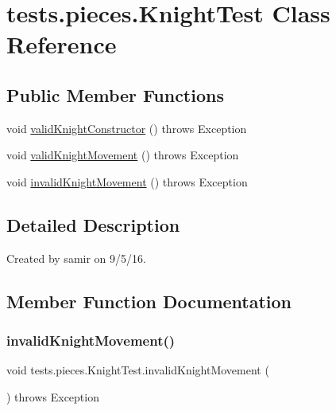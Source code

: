 \hypertarget{classtests_1_1pieces_1_1_knight_test}{}\section{tests.\+pieces.\+Knight\+Test Class Reference}
\label{classtests_1_1pieces_1_1_knight_test}
\subsection*{Public Member Functions}
\begin{DoxyCompactItemize}
\item 
void \hyperlink{classtests_1_1pieces_1_1_knight_test_ac63e8a47040357e6f02594034d0ecb75}{valid\+Knight\+Constructor} ()  throws Exception 
\item 
void \hyperlink{classtests_1_1pieces_1_1_knight_test_a1f441301e64a3dd8330a3646fcb25c0b}{valid\+Knight\+Movement} ()  throws Exception 
\item 
void \hyperlink{classtests_1_1pieces_1_1_knight_test_a8ac79409a204de610658fccd8bbb08ec}{invalid\+Knight\+Movement} ()  throws Exception 
\end{DoxyCompactItemize}


\subsection{Detailed Description}
Created by samir on 9/5/16. 

\subsection{Member Function Documentation}
\hypertarget{classtests_1_1pieces_1_1_knight_test_a8ac79409a204de610658fccd8bbb08ec}{}\label{classtests_1_1pieces_1_1_knight_test_a8ac79409a204de610658fccd8bbb08ec} 
\subsubsection{\texorpdfstring{invalid\+Knight\+Movement()}{invalidKnightMovement()}}
{\footnotesize\ttfamily void tests.\+pieces.\+Knight\+Test.\+invalid\+Knight\+Movement (\begin{DoxyParamCaption}{ }\end{DoxyParamCaption}) throws Exception}

